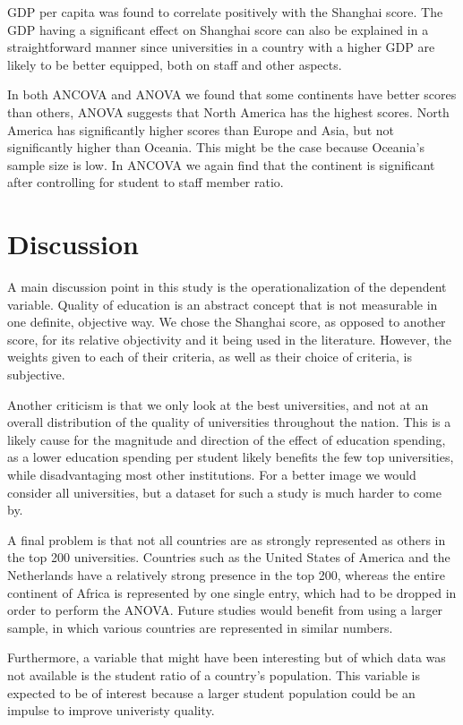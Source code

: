 \documentclass{stats_apa_style2}
\begin{document}
GDP per capita was found to correlate positively with the Shanghai score.
The GDP having a significant effect on Shanghai score can also be
explained in a straightforward manner since universities in a country with a
higher GDP are likely to be better equipped, both on staff and other aspects. 

In both ANCOVA and ANOVA we found that some continents have better scores than
others, ANOVA suggests that North America has the highest scores. North America
has significantly higher scores than Europe and Asia, but not significantly
higher than Oceania. This might be the case because Oceania's sample size is
low. In ANCOVA we again find that the continent is significant
after controlling for student to staff member ratio.

\section*{Discussion}
\label{Discussion}

A main discussion point in this study is the operationalization of the dependent variable. Quality of education is an abstract concept that is not measurable in one definite, objective way. We chose the Shanghai score, as opposed to another score, for its relative objectivity and it being used in the literature. However, the weights given to each of their criteria, as well as their choice of criteria, is subjective.

Another criticism is that we only look at the best universities, and not at an overall distribution of the quality of universities throughout the nation. This is a likely cause for the magnitude and direction of the effect of education spending, as a lower education spending per student likely benefits the few top universities, while disadvantaging most other institutions. For a better image we would consider all universities, but a dataset for such a study is much harder to come by.

A final problem is that not all countries are as strongly represented as others in the top 200 universities. Countries such as the United States of America and the Netherlands have a relatively strong presence in the top 200, whereas the entire continent of Africa is represented by one single entry, which had to be dropped in order to perform the ANOVA. Future studies would benefit from using a larger sample, in which various countries are represented in similar numbers.

Furthermore, a variable that might have been interesting but of which data was
not available is the student ratio of a country's population. This variable
is expected to be of interest because a larger student population could be an
impulse to improve univeristy quality.
\end{document}
